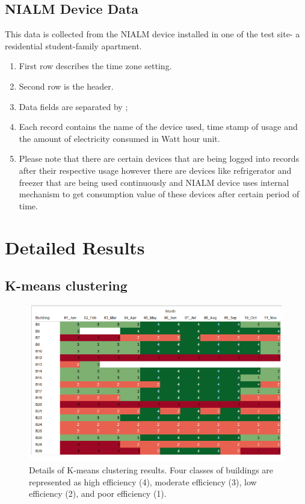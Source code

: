 \section{NIALM Device Data}
This data is collected from the NIALM device installed in one of the test site- a residential student-family apartment.
\begin{enumerate}
\item First row describes the time zone setting.
\item Second row is the header.
\item Data fields are separated by ;
\item Each record contains the name of the device used, time stamp of usage and the amount of electricity consumed in Watt hour unit.
\item Please note that there are certain devices that are being logged into records after their respective usage however there are devices like refrigerator and freezer that are being used continuously and NIALM device uses internal mechanism to get consumption value of these devices after certain period of time.
\end{enumerate}

 

\chapter{Detailed Results}
\label{chapter:appendixd}
\section{K-means clustering}
\begin{figure}[!ht]
    \begin{center}
      \includegraphics[width=\textwidth]{images/appendd1.pdf}
      \caption{Details of K-means clustering results. Four classes of buildings are represented as high efficiency (4), moderate efficiency (3), low efficiency (2), and poor efficiency (1).}
      \label{fig:kmeans_detail}
    \end{center}
\end{figure} 



